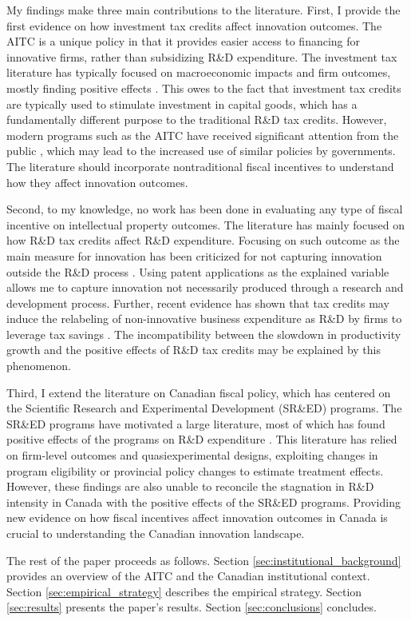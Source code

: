 \documentclass[../main.tex]{subfiles}
\begin{document}
My findings make three main contributions to the literature. First, I provide the first evidence on how investment tax credits affect innovation outcomes. The AITC is a unique policy in that it provides easier access to financing for innovative firms, rather than subsidizing R\&D expenditure. The investment tax literature has typically focused on macroeconomic impacts and firm outcomes, mostly finding positive effects \parencite{pereira94, lyon89, slattery_zidar20}. This owes to the fact that investment tax credits are typically used to stimulate investment in capital goods, which has a fundamentally different purpose to the traditional R\&D tax credits. However, modern programs such as the AITC have received significant attention from the public \parencite{albertachamberofcommerce23,zabjeck16}, which may lead to the increased use of similar policies by governments. The literature should incorporate nontraditional fiscal incentives to understand how they affect innovation outcomes.

Second, to my knowledge, no work has been done in evaluating any type of fiscal incentive on intellectual property outcomes. The literature has mainly focused on how R\&D tax credits affect R\&D expenditure. Focusing on such outcome as the main measure for innovation has been criticized for not capturing innovation outside the R\&D process \parencite{xie_etal19}. Using patent applications as the explained variable allows me to capture innovation not necessarily produced through a research and development process. Further, recent evidence has shown that tax credits may induce the relabeling of non-innovative business expenditure as R\&D by firms to leverage tax savings \parencite{chen_etal21}. The incompatibility between the slowdown in productivity growth and the positive effects of R\&D tax credits may be explained by this phenomenon. 

Third, I extend the literature on Canadian fiscal policy, which has centered on the Scientific Research and Experimental Development (SR\&ED) programs. The SR\&ED programs have motivated a large literature, most of which has found positive effects of the programs on R\&D expenditure \parencite{agrawal_etal20,czarnitzki_etal11,berube_mohnen09,mansfield_switzer85a,bernstein86b}. This literature has relied on firm-level outcomes and quasiexperimental designs, exploiting changes in program eligibility or provincial policy changes to estimate treatment effects. However, these findings are also unable to reconcile the stagnation in R\&D intensity in Canada with the positive effects of the SR\&ED programs. Providing new evidence on how fiscal incentives affect innovation outcomes in Canada is crucial to understanding the Canadian innovation landscape. 

The rest of the paper proceeds as follows. Section \ref{sec:institutional_background} provides an overview of the AITC and the Canadian institutional context. Section \ref{sec:empirical_strategy} describes the empirical strategy. Section \ref{sec:results} presents the paper's results. Section \ref{sec:conclusions} concludes.
\end{document}

